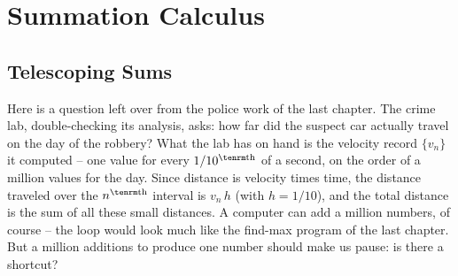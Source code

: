 %
%

\chapter{Summation Calculus}

\section{Telescoping Sums}
Here is a question left over from the police work of the last chapter. The
crime lab, double-checking its analysis, asks: how far did the suspect car
actually travel on the day of the robbery? What the lab has on hand is the
velocity record $\{v_n\}$ it computed -- one value for every $1/10^{\rm th}$
of a second, on the order of a million values for the day. Since distance is
velocity times time, the distance traveled over the $n^{\rm th}$ interval is
$v_n\, h$ (with $h = 1/10$), and the total distance is the sum of all these
small distances. A computer can add a million numbers, of course -- the loop
would look much like the find-max program of the last chapter. But a million
additions to produce one number should make us pause: is there a shortcut?

